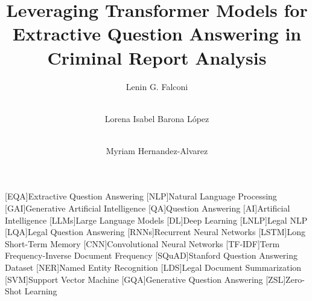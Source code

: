 \documentclass[runningheads]{llncs}
\begin{document}
%
\begin{acronym}
  [EQA]{Extractive Question Answering}
  [NLP]{Natural Language Processing}
  [GAI]{Generative Artificial Intelligence}
  [QA]{Question Answering}
  [AI]{Artificial Intelligence}
  [LLMs]{Large Language Models}
  [DL]{Deep Learning}
  [LNLP]{Legal NLP}
  [LQA]{Legal Question Answering}
  [RNNs]{Recurrent Neural Networks}
  [LSTM]{Long Short-Term Memory}
  [CNN]{Convolutional Neural Networks}
  [TF-IDF]{Term Frequency-Inverse Document Frequency}
  [SQuAD]{Stanford Question Answering Dataset}
  [NER]{Named Entity Recognition}
  [LDS]{Legal Document Summarization}
  [SVM]{Support Vector Machine}
  [GQA]{Generative Question Answering}
  [ZSL]{Zero-Shot Learning}
\end{acronym}
\title{Leveraging Transformer Models for Extractive Question Answering in Criminal Report Analysis}
%
%
\author{Lenin G. Falconi \and\\
Lorena Isabel Barona López\and\\
Myriam Hernandez-Alvarez}
%
%

%
\maketitle              %
\end{document}
